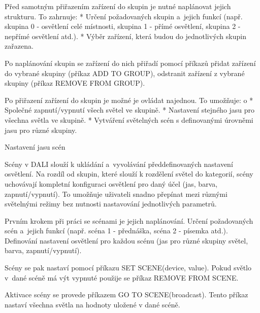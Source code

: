 




Před samotným přiřazením zařízení do skupin je nutné naplánovat jejich strukturu. To zahrnuje:
\begitems
    * Určení požadovaných skupin a~jejich funkcí
    (např. skupina 0 - osvětlení celé místnosti, skupina 1 - přímé osvětlení, skupina 2 - nepřímé osvětlení atd.).
    * Výběr zařízení, která budou do jednotlivých skupin zařazena.
\enditems


Po naplánování skupin se zařízení do nich přiřadí pomocí příkazů
přidat zařízení do vybrané skupiny (příkaz ADD TO GROUP),
odstranit zařízení z vybrané skupiny (příkaz REMOVE FROM GROUP).

\noindent
Po přiřazení zařízení do skupin je možné je ovládat najednou. To umožňuje:
\begitems \style o
    * Společné zapnutí/vypnutí všech světel ve skupině.
    * Nastavení stejného jasu pro všechna světla ve skupině.
    * Vytváření světelných scén s definovanými úrovněmi jasu pro různé skupiny.
\enditems

\medskip \noindent
{\sbf Nastavení jasu scén}


Scény v DALI slouží k ukládání a~vyvolávání předdefinovaných nastavení osvětlení.
Na rozdíl od skupin, které slouží k rozdělení světel do kategorií, scény uchovávají
kompletní konfiguraci osvětlení pro daný účel (jas, barva, zapnutí/vypnutí).
To umožňuje uživateli snadno přepínat mezi různými světelnými režimy bez nutnosti
 nastavování jednotlivých parametrů.


Prvním krokem při práci se scénami je jejich naplánování.
Určení požadovaných scén a~jejich funkcí (např. scéna 1 - přednáška, scéna 2 - písemka atd.).
Definování nastavení osvětlení pro každou scénu (jas pro různé skupiny světel, barva, zapnutí/vypnutí).

Scény se pak nastaví pomocí příkazu SET SCENE(device, value). Pokud světlo v~dané scéně má výt vypnuté
použije se příkaz REMOVE FROM SCENE.

Aktivace scény se provede příkazem GO TO SCENE(broadcast). Tento příkaz nastaví všechna
světla na hodnoty uložené v dané scéně.


